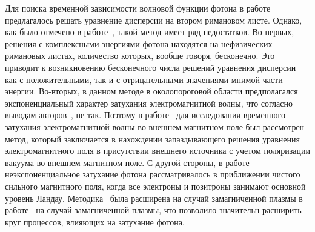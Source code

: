 Для поиска временной зависимости волновой функции фотона в 
работе~\cite{Shabad:1988} предлагалось решать уравнение дисперсии на втором 
римановом листе. Однако, как было отмечено в работе~\cite{MikhChist:2001}, 
такой метод имеет ряд недостатков. Во-первых, решения с комплексными энергиями 
фотона находятся на нефизических римановых листах, количество которых, вообще 
говоря, бесконечно. Это приводит к возникновению бесконечного числа решений 
уравнения дисперсии как с положительными, так и с отрицательными значениями 
мнимой части энергии. Во-вторых, в данном методе в околопороговой области 
предполагался экспоненциальный характер затухания электромагнитной волны, что 
согласно выводам авторов~\cite{MikhChist:2001}, не так. Поэтому 
в работе~\cite{MikhChist:2001} для исследования временного затухания 
электромагнитной волны во внешнем магнитном поле был рассмотрен метод, который 
заключается в нахождении запаздывающего решения уравнения электромагнитного 
поля в присутствии внешнего источника с учетом поляризации вакуума во внешнем 
магнитном поле. С другой стороны, в работе~\cite{MikhChist:2001} 
неэкспоненциальное затухание фотона рассматривалось в приближении чистого сильного 
магнитного поля, когда все электроны и позитроны занимают основной уровень 
Ландау. Методика~\cite{MikhChist:2001} была расширена на случай замагниченной плазмы в работе~\cite{YarkovPhotDampPAN:2022} на случай замагниченной плазмы, что позволило значительн расширить круг процессов, влияющих на затухание фотона.

